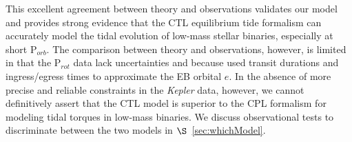 \documentclass[twocolumn]{aastex61}
\newcommand{\kepler}[0]{\textit{Kepler}\xspace}
\begin{document}
This excellent agreement between theory and observations validates our model and provides strong evidence that the CTL equilibrium tide formalism can accurately model the tidal evolution of low-mass stellar binaries, especially at short P$_{orb}$. The comparison between theory and observations, however, is limited in that the \citet{Lurie2017} P$_{rot}$ data lack uncertainties and because \citet{Lurie2017} used transit durations and ingress/egress times to approximate the EB orbital $e$. In the absence of more precise and reliable constraints in the \citet{Lurie2017} \kepler data, however, we cannot definitively assert that the CTL model is superior to the CPL formalism for modeling tidal torques in low-mass binaries.  We discuss observational tests to discriminate between the two models in $\S$~\ref{sec:whichModel}. 


\end{document}
